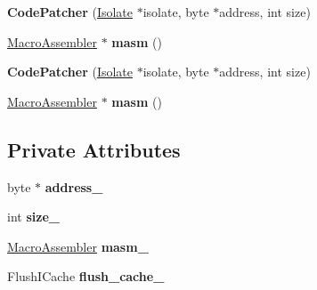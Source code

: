 \begin{DoxyCompactItemize}
\item 
{\bfseries Code\+Patcher} (\hyperlink{classv8_1_1internal_1_1_isolate}{Isolate} $\ast$isolate, byte $\ast$address, int size)\hypertarget{classv8_1_1internal_1_1_code_patcher_aba34590d22b0830620e3782c15df0969}{}\label{classv8_1_1internal_1_1_code_patcher_aba34590d22b0830620e3782c15df0969}

\item 
\hyperlink{classv8_1_1internal_1_1_macro_assembler}{Macro\+Assembler} $\ast$ {\bfseries masm} ()\hypertarget{classv8_1_1internal_1_1_code_patcher_abb06694a38d62fd0a065cf42f2d025e2}{}\label{classv8_1_1internal_1_1_code_patcher_abb06694a38d62fd0a065cf42f2d025e2}

\item 
{\bfseries Code\+Patcher} (\hyperlink{classv8_1_1internal_1_1_isolate}{Isolate} $\ast$isolate, byte $\ast$address, int size)\hypertarget{classv8_1_1internal_1_1_code_patcher_aba34590d22b0830620e3782c15df0969}{}\label{classv8_1_1internal_1_1_code_patcher_aba34590d22b0830620e3782c15df0969}

\item 
\hyperlink{classv8_1_1internal_1_1_macro_assembler}{Macro\+Assembler} $\ast$ {\bfseries masm} ()\hypertarget{classv8_1_1internal_1_1_code_patcher_abb06694a38d62fd0a065cf42f2d025e2}{}\label{classv8_1_1internal_1_1_code_patcher_abb06694a38d62fd0a065cf42f2d025e2}

\end{DoxyCompactItemize}
\subsection*{Private Attributes}
\begin{DoxyCompactItemize}
\item 
byte $\ast$ {\bfseries address\+\_\+}\hypertarget{classv8_1_1internal_1_1_code_patcher_ad89bccbc411647eab4479d16ae74cc64}{}\label{classv8_1_1internal_1_1_code_patcher_ad89bccbc411647eab4479d16ae74cc64}

\item 
int {\bfseries size\+\_\+}\hypertarget{classv8_1_1internal_1_1_code_patcher_a1284cc76db1fbdc310362a1e98c317a4}{}\label{classv8_1_1internal_1_1_code_patcher_a1284cc76db1fbdc310362a1e98c317a4}

\item 
\hyperlink{classv8_1_1internal_1_1_macro_assembler}{Macro\+Assembler} {\bfseries masm\+\_\+}\hypertarget{classv8_1_1internal_1_1_code_patcher_a86c9e3f332dbcb992e1a2bface5912c3}{}\label{classv8_1_1internal_1_1_code_patcher_a86c9e3f332dbcb992e1a2bface5912c3}

\item 
Flush\+I\+Cache {\bfseries flush\+\_\+cache\+\_\+}\hypertarget{classv8_1_1internal_1_1_code_patcher_a9c9247804fbfc12670f213fc211b2e75}{}\label{classv8_1_1internal_1_1_code_patcher_a9c9247804fbfc12670f213fc211b2e75}

\end{DoxyCompactItemize}


